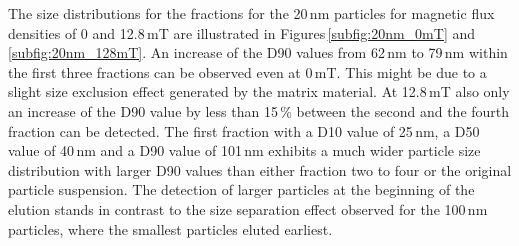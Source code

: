 The size distributions for the fractions for the 20\,nm particles for magnetic flux densities of 0 and 12.8\,mT are illustrated in Figures\,\ref{subfig:20nm_0mT} and \ref{subfig:20nm_128mT}. An increase of the D90 values from 62\,nm to 79\,nm within the first three fractions can be observed even at 0\,mT. This might be due to a slight size exclusion effect generated by the matrix material. At 12.8\,mT  also only an increase of the D90 value by less than 15\,\% between the second and the fourth fraction can be detected. The first fraction with a D10 value of 25\,nm, a D50 value of 40\,nm and a D90 value of 101\,nm exhibits a much wider particle size distribution with larger D90 values than either fraction two to four or the original particle suspension. The detection of larger particles at the beginning of the elution stands in contrast to the size separation effect observed for the 100\,nm particles, where the smallest particles eluted earliest.

